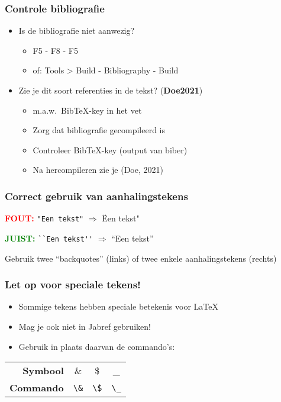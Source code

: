 \documentclass[aspectratio=169]{beamer}
\begin{document}
\begin{frame}
  \frametitle{Controle bibliografie}

  \begin{itemize}
    \item Is de bibliografie niet aanwezig?
          \begin{itemize}
            \item F5 - F8 - F5
            \item of: Tools > Build - Bibliography - Build
          \end{itemize}
    \item Zie je dit soort referenties in de tekst? (\textbf{Doe2021})
          \begin{itemize}
            \item m.a.w.~Bib{\TeX}-key in het vet
            \item Zorg dat bibliografie gecompileerd is
            \item Controleer Bib{\TeX}-key (output van biber)
            \item Na hercompileren zie je (Doe, 2021)
          \end{itemize}
  \end{itemize}

\end{frame}

\begin{frame}[fragile]
  \frametitle{Correct gebruik van aanhalingstekens}

  \textcolor{red}{\textbf{FOUT:}} \verb|"Een tekst"| $\Rightarrow$ \"Een tekst"

  \bigskip

  \textcolor{green}{\textbf{JUIST:}} \verb|``Een tekst''| $\Rightarrow$ ``Een tekst''

  \bigskip

  Gebruik twee ``backquotes'' (links) of twee enkele aanhalingstekens (rechts)
\end{frame}

\begin{frame}[fragile]
  \frametitle{Let op voor speciale tekens!}

  \begin{itemize}
    \item Sommige tekens hebben speciale betekenis voor {\LaTeX}
    \item Mag je ook niet in Jabref gebruiken!
    \item Gebruik in plaats daarvan de commando's:
  \end{itemize}

  \bigskip

\begin{center}
  \begin{tabular}{rccc}
    \toprule
    \textbf{Symbool}  & \&        & \$        & \_        \\
    \textbf{Commando} & \verb+\&+ & \verb+\$+ & \verb+\_+ \\
    \bottomrule
  \end{tabular}
\end{center}
\end{frame}
\end{document}

